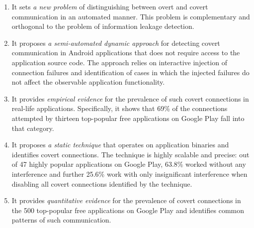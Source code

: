 \vspace{-0.05in}
\begin{enumerate}[leftmargin=0.5cm]\setlength{\itemsep}{-0.01in}

\item It sets \emph{a new problem} of distinguishing between overt and covert communication in an automated manner. 
This problem is complementary and orthogonal to the problem of information leakage detection. 

\item It proposes \emph{a semi-automated dynamic approach} for detecting covert communication in Android applications that does not require access to the application source code. 
The approach relies on interactive injection of connection failures
and identification of cases in which the injected failures do not
affect the observable application functionality.

\item It provides \emph{empirical evidence} for the prevalence of such covert connections in real-life applications. Specifically, it shows that 69\% of the connections attempted by thirteen top-popular free applications on Google Play fall into that category.    

\item It proposes \emph{a static technique} that operates on
application binaries and identifies covert connections. 
The
technique is highly scalable and precise: out of 47 highly popular
applications on Google Play, 63.8\% worked without any interference
and further 25.6\% work with only insignificant interference when
disabling all covert connections identified by the technique.


\item It provides \emph{quantitative evidence} for the prevalence of covert connections in the 500 top-popular free applications on Google Play and identifies common patterns of such communication. 


\end{enumerate}




